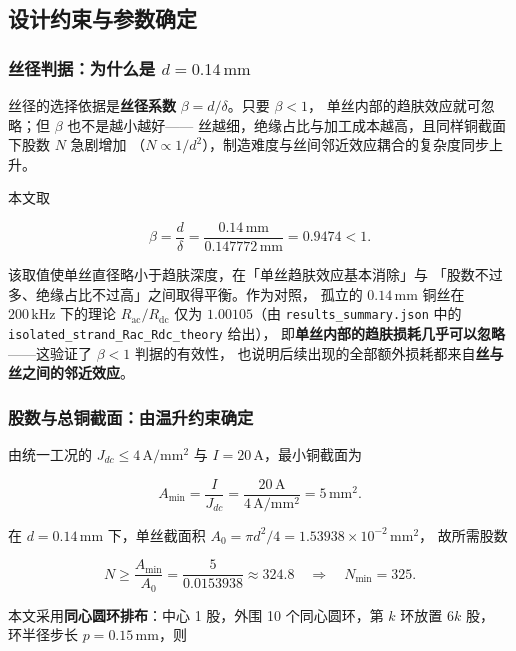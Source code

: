 \documentclass[12pt, a4paper]{ctexart}
\newcommand{\Rac}{R_{\mathrm{ac}}}
\newcommand{\Rdc}{R_{\mathrm{dc}}}
\newcommand{\U}[1]{\ensuremath{\,\mathrm{#1}}}
\begin{document}
\subsection{设计约束与参数确定}

\subsubsection{丝径判据：为什么是 $d = 0.14\U{mm}$}

丝径的选择依据是\textbf{丝径系数} $\beta = d/\delta$。只要 $\beta < 1$，
单丝内部的趋肤效应就可忽略；但 $\beta$ 也不是越小越好——
丝越细，绝缘占比与加工成本越高，且同样铜截面下股数 $N$ 急剧增加
（$N \propto 1/d^2$），制造难度与丝间邻近效应耦合的复杂度同步上升。

本文取

\begin{equation}
\beta = \frac{d}{\delta} = \frac{0.14\U{mm}}{0.147772\U{mm}} = 0.9474 < 1 .
\label{eq:beta}
\end{equation}

该取值使单丝直径略小于趋肤深度，在「单丝趋肤效应基本消除」与
「股数不过多、绝缘占比不过高」之间取得平衡。作为对照，
孤立的 $0.14\U{mm}$ 铜丝在 $200\U{kHz}$ 下的理论
$\Rac/\Rdc$ 仅为 $1.00105$（由 \texttt{results\_summary.json} 中的
\texttt{isolated\_strand\_Rac\_Rdc\_theory} 给出），
即\textbf{单丝内部的趋肤损耗几乎可以忽略}——这验证了 $\beta < 1$ 判据的有效性，
也说明后续出现的全部额外损耗都来自\textbf{丝与丝之间的邻近效应}。

\subsubsection{股数与总铜截面：由温升约束确定}

由统一工况的 $J_{dc}\le 4\U{A/mm^2}$ 与 $I = 20\U{A}$，最小铜截面为

\begin{equation}
A_{\min} = \frac{I}{J_{dc}} = \frac{20\U{A}}{4\U{A/mm^2}} = 5\U{mm^2} .
\end{equation}

在 $d = 0.14\U{mm}$ 下，单丝截面积 $A_0 = \pi d^2/4 = 1.53938\times10^{-2}\U{mm^2}$，
故所需股数

\begin{equation}
N \ge \frac{A_{\min}}{A_0} = \frac{5}{0.0153938} \approx 324.8
\quad\Longrightarrow\quad N_{\min} = 325 .
\end{equation}

本文采用\textbf{同心圆环排布}：中心 1 股，外围 10 个同心圆环，第 $k$ 环放置 $6k$ 股，
环半径步长 $p = 0.15\U{mm}$，则
\end{document}
